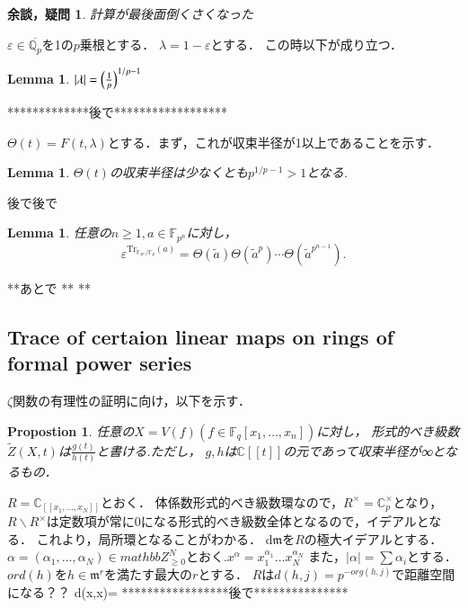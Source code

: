 \documentclass{ujarticle}
\newtheorem{prop}[thm]{Propostion}
\newtheorem{lem}[thm]{Lemma}
\newtheorem*{yodan}{余談，疑問}
\def\ol#1{\overline{#1}{}}
\begin{document}
\begin{yodan}
計算が最後面倒くさくなった
\end{yodan}

$\varepsilon \in \ol {\mathbb{Q}_p}$を1の$p$乗根とする．
$\lambda= 1- \varepsilon$とする．
この時以下が成り立つ．
\begin{lem}
 $|\lambda| = \Bigl( \frac{1}{p} \Bigr)^{1/p-1}$
\end{lem}
*************後で******************

$\Theta(t)=F(t,\lambda)$とする．まず，これが収束半径が1以上であることを示す．
\begin{lem}
$\Theta(t)$の収束半径は少なくとも$p^{1/p-1} \gt 1$となる.
\end{lem}
後で後で
\begin{lem}
 任意の$n \ge 1,a \in \mathbb{F}_{p^n}$に対し，
 \begin{equation*}
  \varepsilon^{\mathrm{Tr}_{\mathbb{F}_{p^n}/\mathbb{F}_p}(a)}=\Theta(\tilde{a})\Theta(\tilde{a}^p)\cdots\Theta(\tilde{a}^{{p}^{n-1}}) .
 \end{equation*}
\end{lem}
**あとで
**
**

\subsection{Trace of certaion linear maps on rings of formal power series}
\label{sub:Trace of certaion linear maps on rings of formal power series}

$\zeta$関数の有理性の証明に向け，以下を示す．

\begin{prop}
 任意の$X=V(f)(f \in \mathbb{F}_q[x_1,\dots,x_n]) $に対し，
 形式的べき級数$\tilde{Z}(X,t)$は$\frac{g(t)}{h(t)}$と書ける.ただし，
 $g,h$は$\mathbb{C}[[t]]$の元であって収束半径が∞となるもの．
\end{prop}

$R=\mathbb{C}_[[x_1,\dots,x_N]]$とおく．
体係数形式的べき級数環なので，$R^{\times} = \mathbb{C}_p^{\times}$となり，
$R \backslash R^{\times}$は定数項が常に$0$になる形式的べき級数全体となるので，イデアルとなる．
これより，局所環となることがわかる．
d$\mathfrak{m}$を$R$の極大イデアルとする．$\alpha=(\alpha_1,\dots,\alpha_N)\in
mathbb{Z}_{\ge 0}^N$とおく.$x^{\alpha}=x_1^{\alpha_1}\dots x_N^{\alpha_N}$
また，$|\alpha|=\sum \alpha_i$とする．
$ord(h)$を$h \in \mathfrak{m}^r$を満たす最大の$r$とする．
$R$は$d(h,j)=p^{-org(h,j)}$で距離空間になる？？
d(x,x)=
*****************後で***************
\end{document}
